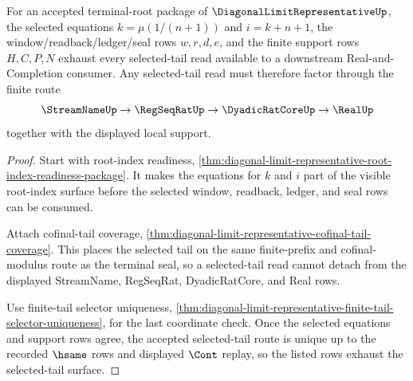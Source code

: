 \begin{theorem}
\label{thm:diagonal-limit-representative-selected-tail-coverage}
For an accepted terminal-root package of $\DiagonalLimitRepresentativeUp$, the selected equations $k=\mu(1/(n+1))$ and $i=k+n+1$, the window/readback/ledger/seal rows $w,r,d,e$, and the finite support rows $H,C,P,N$ exhaust every selected-tail read available to a downstream Real-and-Completion consumer. Any selected-tail read must therefore factor through the finite route
$$
\StreamNameUp \to \RegSeqRatUp \to \DyadicRatCoreUp \to \RealUp
$$
together with the displayed local support.
\end{theorem}
\begin{proof}
Start with root-index readiness, \autoref{thm:diagonal-limit-representative-root-index-readiness-package}. It makes the equations for $k$ and $i$ part of the visible root-index surface before the selected window, readback, ledger, and seal rows can be consumed.

Attach cofinal-tail coverage, \autoref{thm:diagonal-limit-representative-cofinal-tail-coverage}. This places the selected tail on the same finite-prefix and cofinal-modulus route as the terminal seal, so a selected-tail read cannot detach from the displayed StreamName, RegSeqRat, DyadicRatCore, and Real rows.

Use finite-tail selector uniqueness, \autoref{thm:diagonal-limit-representative-finite-tail-selector-uniqueness}, for the last coordinate check. Once the selected equations and support rows agree, the accepted selected-tail route is unique up to the recorded $\hsame$ rows and displayed $\Cont$ replay, so the listed rows exhaust the selected-tail surface.
\end{proof}

